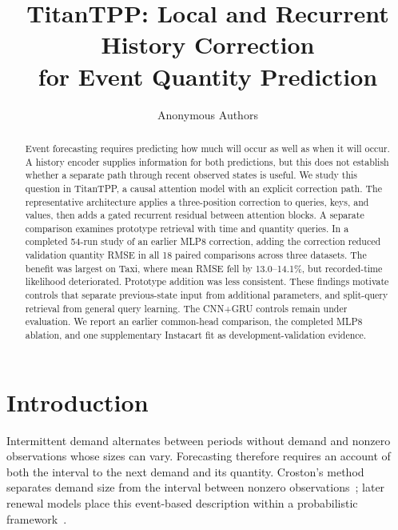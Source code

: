 \documentclass[runningheads]{llncs}
\begin{document}
\title{TitanTPP: Local and Recurrent History Correction\texorpdfstring{\\}{ }for Event Quantity Prediction}
\author{Anonymous Authors}
\maketitle

\begin{abstract}
Event forecasting requires predicting how much will occur as well as when it will occur. A history encoder supplies information for both predictions, but this does not establish whether a separate path through recent observed states is useful. We study this question in TitanTPP, a causal attention model with an explicit correction path. The representative architecture applies a three-position correction to queries, keys, and values, then adds a gated recurrent residual between attention blocks. A separate comparison examines prototype retrieval with time and quantity queries. In a completed 54-run study of an earlier MLP8 correction, adding the correction reduced validation quantity RMSE in all 18 paired comparisons across three datasets. The benefit was largest on Taxi, where mean RMSE fell by 13.0--14.1\%, but recorded-time likelihood deteriorated. Prototype addition was less consistent. These findings motivate controls that separate previous-state input from additional parameters, and split-query retrieval from general query learning. The CNN+GRU controls remain under evaluation. We report an earlier common-head comparison, the completed MLP8 ablation, and one supplementary Instacart fit as development-validation evidence.
\end{abstract}

\section{Introduction}
Intermittent demand alternates between periods without demand and nonzero observations whose sizes can vary. Forecasting therefore requires an account of both the interval to the next demand and its quantity. Croston's method separates demand size from the interval between nonzero observations~\cite{croston1972forecasting}; later renewal models place this event-based description within a probabilistic framework~\cite{turkmen2021renewal}.
\end{document}
